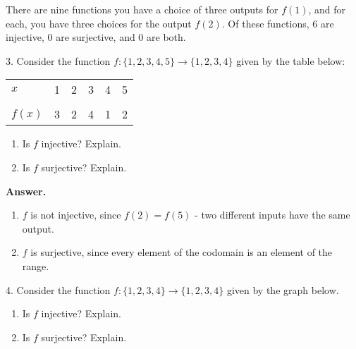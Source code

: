 \documentclass[10pt,]{book}
\theoremstyle{plain}
\theoremstyle{definition}
\theoremstyle{definition}
\theoremstyle{definition}
\numberwithin{equation}{section}
\newcommand{\hrulethin}  {\noalign{\hrule height 0.04em}}
\begin{document}
\begin{exerciselist}
There are nine functions \textendash{} you have a choice of three outputs for \(f(1)\), and for each, you have three choices for the output \(f(2)\). Of these functions, 6 are injective, 0 are surjective, and 0 are both.
%
\item[3.]\hypertarget{exercise-19}{}
Consider the function \(f:\{1,2,3,4,5\} \to \{1,2,3,4\}\) given by the table below:
%
\begin{tabular}{llllll}
\(x\)&1&2&3&4&5\tabularnewline[0pt]
&&&&&\tabularnewline\hrulethin
\(f(x)\)&3&2&4&1&2
\end{tabular}
\leavevmode%
\begin{enumerate}[label=(\alph*)]
\item\hypertarget{li-189}{}
Is \(f\) injective?  Explain.
%
\item\hypertarget{li-190}{}
Is \(f\) surjective?  Explain.
%
\end{enumerate}
\par\smallskip
\par\smallskip
\noindent\textbf{Answer.}\hypertarget{answer-19}{}\quad
\leavevmode%
\begin{enumerate}[label=(\alph*)]
\item\hypertarget{li-191}{}\(f\) is not injective, since \(f(2) = f(5)\) - two different inputs have the same output.\item\hypertarget{li-192}{}\(f\) is surjective, since every element of the codomain is an element of the range.\end{enumerate}
\item[4.]\hypertarget{exercise-20}{}
Consider the function \(f:\{1,2,3,4\} \to \{1,2,3,4\}\) given by the graph below.
%
{
}
\leavevmode%
\begin{enumerate}[label=(\alph*)]
\item\hypertarget{li-193}{}
Is \(f\) injective?  Explain.
%
\item\hypertarget{li-194}{}
Is \(f\) surjective?  Explain.
%
\end{enumerate}
\par\smallskip
\par\smallskip

\end{exerciselist}
\end{document}
